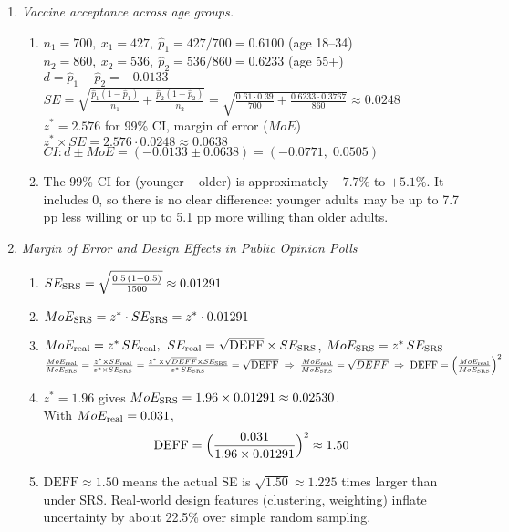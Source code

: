 \documentclass{article}
\begin{document}
\begin{enumerate}
\item \emph{Vaccine acceptance across age groups.}
\begin{enumerate}[label=(\alph*)]
  \item 
    $n_1=700,\ x_1=427,\ \hat p_1=427/700=0.6100$ (age 18–34)\\
    $n_2=860,\ x_2=536,\ \hat p_2=536/860=0.6233$ (age 55+)\\
    $d=\hat p_1-\hat p_2=-0.0133$\\
    $SE=\sqrt{\frac{\hat p_1(1-\hat p_1)}{n_1}+\frac{\hat p_2(1-\hat p_2)}{n_2}}
       =\sqrt{\frac{0.61\cdot0.39}{700}+\frac{0.6233\cdot0.3767}{860}}\approx0.0248$\\
    $z^*=2.576$ for 99\% CI, margin of error ($MoE$) $z^* \times SE=2.576\cdot0.0248\approx0.0638$\\
    $\displaystyle CI:d\pm MoE=(-0.0133\pm0.0638)=(-0.0771,\;0.0505)$
  \item 
    The 99\% CI for (younger – older) is approximately \(-7.7\%\) to \(+5.1\%\).  
    It includes 0, so there is no clear difference: younger adults may be up to 7.7 pp less willing or up to 5.1 pp more willing than older adults.  
\end{enumerate}

\item \emph{Margin of Error and Design Effects in Public Opinion Polls}
\begin{enumerate}[label=(\alph*)]
  \item 
    $SE_{\rm SRS}=\sqrt{\frac{0.5\,(1-0.5)}{1500}}\approx0.01291$
  \item 
    $MoE_{\rm SRS}=z^*\cdot SE_{\rm SRS}=z^*\cdot 0.01291$
  \item 
    $MoE_{\rm real}=z^*\,SE_{\rm real},$ \quad $SE_{\rm real}=\sqrt{\mathrm{DEFF}}\times SE_{\rm SRS}$, \quad  $MoE_{\rm SRS}=z^*\,SE_{\rm SRS}$ \\
    $\frac{MoE_{\rm real}}{MoE_{\rm SRS}}
      =\frac{z^*\times SE_{\rm real}}{z^*\times SE_{\rm SRS}}
      =\frac{z^*\,\times \sqrt{DEFF} \times SE_{\rm SRS}}{z^*\,SE_{\rm SRS}}
      =\sqrt{\mathrm{DEFF}}
    \;\Rightarrow\;
\frac{MoE_{\rm real}}{MoE_{\rm SRS}} = \sqrt{DEFF}
    \;\Rightarrow\;
    \mathrm{DEFF}=\Bigl(\frac{MoE_{\rm real}}{{MoE_{\rm SRS}} }\Bigr)^2$
  \item 
    $z^*=1.96$ gives 
    $MoE_{\rm SRS}=1.96\times0.01291\approx0.02530$.\\
    With $MoE_{\rm real}=0.031$,
    \[
      \mathrm{DEFF}=\Bigl(\frac{0.031}{1.96\times0.01291}\Bigr)^2\approx1.50
    \]
  \item 
    $\mathrm{DEFF}\approx1.50$ means the actual SE is $\sqrt{1.50}\approx1.225$ times larger than under SRS.  
    Real‐world design features (clustering, weighting) inflate uncertainty by about 22.5\% over simple random sampling.
\end{enumerate}


\end{enumerate}
\end{document}
